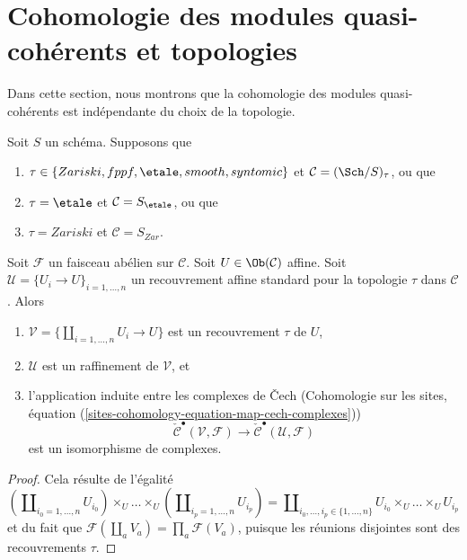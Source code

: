\section{Cohomologie des modules quasi-cohérents et topologies}
\label{section-quasi-coherent-cohomology}

\noindent
Dans cette section, nous montrons que la cohomologie des modules
quasi-cohérents est indépendante du choix de la topologie.

\begin{lemma}
\label{lemma-standard-covering-Cech}
Soit $S$ un schéma. Supposons que
\begin{enumerate}
\item[(a)] $\tau \in \{Zariski, \linebreak[0] fppf, \linebreak[0]
\etale, \linebreak[0] smooth, \linebreak[0] syntomic\}$ et
$\mathcal{C} = (\Sch/S)_\tau$, ou que
\item[(b)] $\tau = \etale$ et $\mathcal{C} = S_\etale$, ou que
\item[(c)] $\tau = Zariski$ et $\mathcal{C} = S_{Zar}$.
\end{enumerate}
Soit $\mathcal{F}$ un faisceau abélien sur $\mathcal{C}$.
Soit $U \in \Ob(\mathcal{C})$ affine.
Soit $\mathcal{U} = \{U_i \to U\}_{i = 1, \ldots, n}$ un recouvrement
affine standard pour la topologie $\tau$ dans $\mathcal{C}$. Alors
\begin{enumerate}
\item $\mathcal{V} = \{\coprod_{i = 1, \ldots, n} U_i \to U\}$ est un
recouvrement $\tau$ de $U$,
\item $\mathcal{U}$ est un raffinement de $\mathcal{V}$, et
\item l'application induite entre les complexes de {\v C}ech
(Cohomologie sur les sites,
équation (\ref{sites-cohomology-equation-map-cech-complexes}))
$$
\check{\mathcal{C}}^\bullet(\mathcal{V}, \mathcal{F})
\longrightarrow
\check{\mathcal{C}}^\bullet(\mathcal{U}, \mathcal{F})
$$
est un isomorphisme de complexes.
\end{enumerate}
\end{lemma}

\begin{proof}
Cela résulte de l'égalité
$$
(\coprod\nolimits_{i_0 = 1, \ldots, n} U_{i_0}) \times_U
\ldots \times_U
(\coprod\nolimits_{i_p = 1, \ldots, n} U_{i_p})
=
\coprod\nolimits_{i_0, \ldots, i_p \in \{1, \ldots, n\}}
U_{i_0} \times_U \ldots \times_U U_{i_p}
$$
et du fait que
$\mathcal{F}(\coprod_a V_a) = \prod_a \mathcal{F}(V_a)$, puisque les
réunions disjointes sont des recouvrements $\tau$.
\end{proof}

